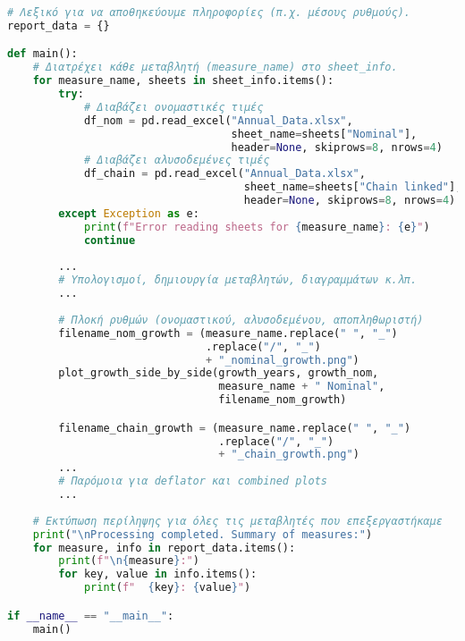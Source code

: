 \documentclass{book}
\begin{document}
\begin{tcolorbox}[colback=white,colframe=black,title=Κύρια Συνάρτηση \texttt{main} (Άσκηση 4)]
\begin{lstlisting}[language=Python]
# Λεξικό για να αποθηκεύουμε πληροφορίες (π.χ. μέσους ρυθμούς).
report_data = {}

def main():
    # Διατρέχει κάθε μεταβλητή (measure_name) στο sheet_info.
    for measure_name, sheets in sheet_info.items():
        try:
            # Διαβάζει ονομαστικές τιμές
            df_nom = pd.read_excel("Annual_Data.xlsx",
                                   sheet_name=sheets["Nominal"],
                                   header=None, skiprows=8, nrows=4)
            # Διαβάζει αλυσοδεμένες τιμές
            df_chain = pd.read_excel("Annual_Data.xlsx",
                                     sheet_name=sheets["Chain linked"],
                                     header=None, skiprows=8, nrows=4)
        except Exception as e:
            print(f"Error reading sheets for {measure_name}: {e}")
            continue
        
        ...
        # Υπολογισμοί, δημιουργία μεταβλητών, διαγραμμάτων κ.λπ.
        ...
        
        # Πλοκή ρυθμών (ονομαστικού, αλυσοδεμένου, αποπληθωριστή)
        filename_nom_growth = (measure_name.replace(" ", "_")
                               .replace("/", "_") 
                               + "_nominal_growth.png")
        plot_growth_side_by_side(growth_years, growth_nom, 
                                 measure_name + " Nominal", 
                                 filename_nom_growth)

        filename_chain_growth = (measure_name.replace(" ", "_")
                                 .replace("/", "_") 
                                 + "_chain_growth.png")
        ...
        # Παρόμοια για deflator και combined plots
        ...
    
    # Εκτύπωση περίληψης για όλες τις μεταβλητές που επεξεργαστήκαμε
    print("\nProcessing completed. Summary of measures:")
    for measure, info in report_data.items():
        print(f"\n{measure}:")
        for key, value in info.items():
            print(f"  {key}: {value}")

if __name__ == "__main__":
    main()
\end{lstlisting}
\end{tcolorbox}
\end{document}
